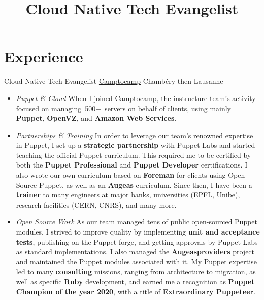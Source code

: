 \documentclass[11pt,a4paper,nolmodern]{moderncv}
\title{Cloud Native Tech Evangelist}
\begin{document}
\setmainfont{Minion Pro}
\setsansfont{Myriad Pro}

\maketitle


\section{Experience}

          {Cloud Native Tech Evangelist}
          {\href{http://www.camptocamp.com}{Camptocamp}}
          {Chambéry then Lausanne}
          {}
          {
  \begin{itemize}
    \item \emph{Puppet \& Cloud}\newline
      When I joined Camptocamp, the instructure team's activity focused on
      managing 500+ servers on behalf of clients, using mainly \textbf{Puppet}, \textbf{OpenVZ}, and \textbf{Amazon Web Services}.
    \item \emph{Partnerships \& Training}\newline
      In order to leverage our team's renowned expertise in Puppet,
      I set up a \textbf{strategic partnership} with Puppet Labs and started teaching the official
      Puppet curriculum. This required me to be certified by both the \textbf{Puppet Professional} and \textbf{Puppet Developer} certifications.
      I also wrote our own curriculum based on \textbf{Foreman} for clients using Open Source Puppet, 
      as well as an \textbf{Augeas} curriculum.\newline
      Since then, I have been a \textbf{trainer} to many engineers at major banks, universities (EPFL, Unibe), research facilities (CERN, CNRS), and many more.
    \item \emph{Open Source Work}\newline
      As our team managed tens of public open-sourced Puppet modules, I strived to improve quality
      by implementing \textbf{unit and acceptance tests}, publishing on the Puppet forge, and getting approvals by Puppet Labs as standard implementations. I also managed the \textbf{Augeasproviders} project and maintained the Puppet modules associated with it.
      My Puppet expertise led to many \textbf{consulting} missions, ranging from architecture to migration,
      as well as specific \textbf{Ruby} development, and earned me a recognition as \textbf{Puppet Champion of the year 2020}, with a title of \textbf{Extraordinary Puppeteer}.

\end{itemize}}
\end{document}
